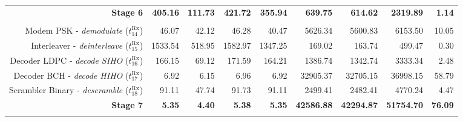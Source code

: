 \begin{table}[htp]
{{\begin{tabular}{r | r r r r  | r r r | r}
                                                             \textbf{Stage 6} &  \textbf{405.16} &   \textbf{111.73} &   \textbf{421.72} &                         \textbf{355.94} &   \textbf{639.75} &   \textbf{614.62} &  \textbf{2319.89} &  \textbf{1.14} \\ %
                                                                              &                  &                   &                   &                                         &                   &                   &                   &                \\
                        Modem PSK -    \emph{demodulate} ($t^\text{Rx}_{14}$) &           46.07  &            42.12  &            46.28  &                                  40.47  &          5626.34  &          5600.83  &          6153.50  &         10.05  \\
                      Interleaver -  \emph{deinterleave} ($t^\text{Rx}_{15}$) &         1533.54  &           518.95  &          1582.97  &                                1347.25  &           169.02  &           163.74  &           499.47  &          0.30  \\
                     Decoder LDPC -   \emph{decode SIHO} ($t^\text{Rx}_{16}$) &          166.15  &            69.12  &           171.59  &                                 164.21  &          1386.74  &          1342.74  &          3333.34  &          2.48  \\
                      Decoder BCH -   \emph{decode HIHO} ($t^\text{Rx}_{17}$) &            6.92  &             6.15  &             6.96  &                                   6.92  &         32905.37  &         32705.15  &         36998.15  &         58.79  \\
                 Scrambler Binary -    \emph{descramble} ($t^\text{Rx}_{18}$) &           91.11  &            47.74  &            91.73  &                                  91.11  &          2499.41  &          2482.41  &          4770.24  &          4.47  \\ \hline
    \rowcolor{Paired-1!15}                                   \textbf{Stage 7} &    \textbf{5.35} &     \textbf{4.40} &     \textbf{5.38} &                           \textbf{5.35} & \textbf{42586.88} & \textbf{42294.87} & \textbf{51754.70} & \textbf{76.09} \\ %
                                                                              &                  &                   &                   &                                         &                   &                   &                   &                \\

\end{tabular}}}
\end{table}
